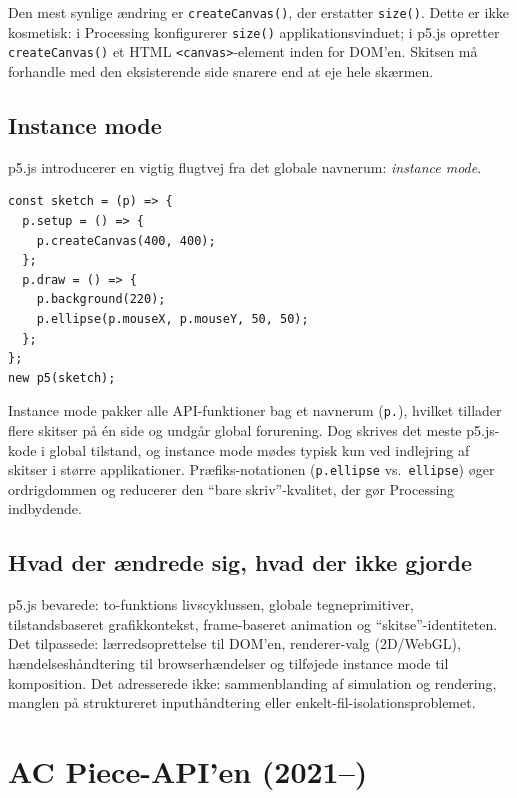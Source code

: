 \documentclass[10pt,letterpaper,twocolumn]{article}
\begin{document}
Den mest synlige ændring er \texttt{createCanvas()}, der erstatter \texttt{size()}. Dette er ikke kosmetisk: i Processing konfigurerer \texttt{size()} applikationsvinduet; i p5.js opretter \texttt{createCanvas()} et HTML \texttt{<canvas>}-element inden for DOM'en. Skitsen må forhandle med den eksisterende side snarere end at eje hele skærmen.

\subsection{Instance mode}

p5.js introducerer en vigtig flugtvej fra det globale navnerum: \emph{instance mode}.

\begin{lstlisting}[style=p5style,caption={p5.js instance mode.}]
const sketch = (p) => {
  p.setup = () => {
    p.createCanvas(400, 400);
  };
  p.draw = () => {
    p.background(220);
    p.ellipse(p.mouseX, p.mouseY, 50, 50);
  };
};
new p5(sketch);
\end{lstlisting}

Instance mode pakker alle API-funktioner bag et navnerum (\texttt{p.}), hvilket tillader flere skitser på én side og undgår global forurening. Dog skrives det meste p5.js-kode i global tilstand, og instance mode mødes typisk kun ved indlejring af skitser i større applikationer. Præfiks-notationen (\texttt{p.ellipse} vs.\ \texttt{ellipse}) øger ordrigdommen og reducerer den ``bare skriv''-kvalitet, der gør Processing indbydende.

\subsection{Hvad der ændrede sig, hvad der ikke gjorde}

p5.js bevarede: to-funktions livscyklussen, globale tegneprimitiver, tilstandsbaseret grafikkontekst, frame-baseret animation og ``skitse''-identiteten. Det tilpassede: lærredsoprettelse til DOM'en, renderer-valg (2D/WebGL), hændelseshåndtering til browserhændelser og tilføjede instance mode til komposition. Det adresserede ikke: sammenblanding af simulation og rendering, manglen på struktureret inputhåndtering eller enkelt-fil-isolationsproblemet.


\section{AC Piece-API'en (2021--)}
\label{sec:ac}
\end{document}
